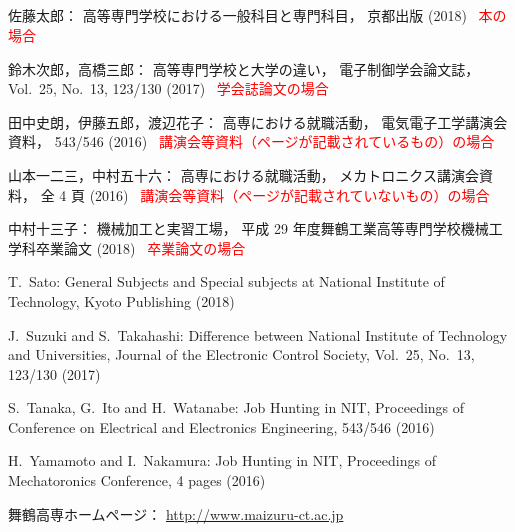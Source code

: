 \begin{center}
\section*{}                      %
\vspace*{-2zh}
\end{center}

\begin{thebibliography}{99}

	佐藤太郎：
	高等専門学校における一般科目と専門科目，
	京都出版 (2018)
	\textcolor{red}{\quad\cdotfill\ 本の場合}
	
	鈴木次郎，高橋三郎：
	高等専門学校と大学の違い，
	電子制御学会論文誌，
	Vol.~25, No.~13, 123/130 (2017)
	\textcolor{red}{\quad\cdotfill\ 学会誌論文の場合}
	
	田中史朗，伊藤五郎，渡辺花子：
	高専における就職活動，
	電気電子工学講演会資料，
	543/546 (2016)
	\textcolor{red}{\quad\cdotfill\ 講演会等資料（ページが記載されているもの）の場合}
	
	山本一二三，中村五十六：
	高専における就職活動，
	メカトロニクス講演会資料，
	全 4 頁 (2016)
	\textcolor{red}{\quad\cdotfill\ 講演会等資料（ページが記載されていないもの）の場合}
	
	中村十三子：
	機械加工と実習工場，
	平成 29 年度舞鶴工業高等専門学校機械工学科卒業論文 (2018)
	\textcolor{red}{\quad\cdotfill\ 卒業論文の場合}
	
	T.~Sato: 
	General Subjects and Special subjects at National Institute of Technology, 
	Kyoto Publishing (2018)
	
	J.~Suzuki and S.~Takahashi: 
	Difference between National Institute of Technology and Universities, 
	Journal of the Electronic Control Society, 
	Vol.~25, No.~13, 123/130 (2017)
	
	S.~Tanaka, G.~Ito and H.~Watanabe: 
	Job Hunting in NIT, 
	Proceedings of Conference on Electrical and Electronics Engineering, 
	543/546 (2016)
	
	H.~Yamamoto and I.~Nakamura: 
	Job Hunting in NIT, 
	Proceedings of Mechatoronics Conference, 
	4 pages (2016)
	
	舞鶴高専ホームページ：
	\url{http://www.maizuru-ct.ac.jp}
\end{thebibliography}
